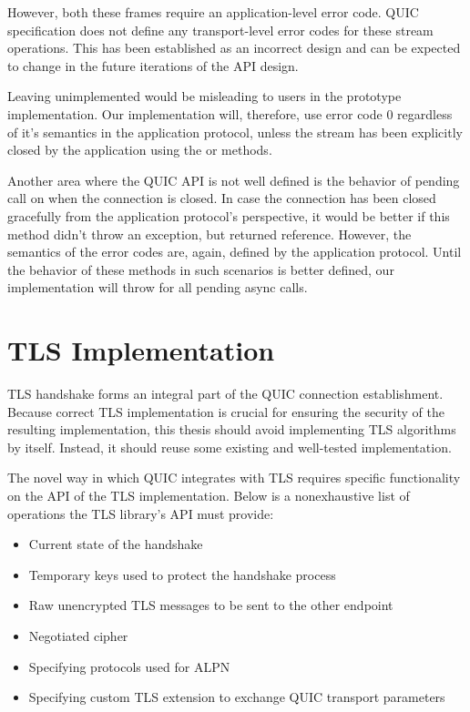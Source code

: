 However, both these frames require an application-level error code. QUIC specification does not
define any transport-level error codes for these stream operations. This has been established as an
incorrect design and can be expected to change in the future iterations of the API design.

Leaving  unimplemented would be misleading to users in the prototype
implementation. Our implementation will, therefore, use error code 0 regardless of it's semantics in
the application protocol, unless the stream has been explicitly closed by the application using the
 or  methods.

Another area where the QUIC API is not well defined is the behavior of pending 
call on \QuicConnection{} when the connection is closed. In case the connection has been closed
gracefully from the application protocol's perspective, it would be better if this method didn't
throw an exception, but returned  reference. However, the semantics of the error codes
are, again, defined by the application protocol. Until the behavior of these methods in such
scenarios is better defined, our implementation will throw
 for all pending async calls.

\section{TLS Implementation}

TLS handshake forms an integral part of the QUIC connection establishment. Because correct TLS
implementation is crucial for ensuring the security of the resulting implementation, this thesis
should avoid implementing TLS algorithms by itself. Instead, it should reuse some existing and
well-tested implementation.

The novel way in which QUIC integrates with TLS requires specific functionality on the API of the
TLS implementation. Below is a nonexhaustive list of operations the TLS library's API must provide:

\begin{itemize}

  \item Current state of the handshake

  \item Temporary keys used to protect the handshake process

  \item Raw unencrypted TLS messages to be sent to the other endpoint

  \item Negotiated cipher

  \item Specifying protocols used for ALPN

  \item Specifying custom TLS extension to exchange QUIC transport parameters

\end{itemize}

